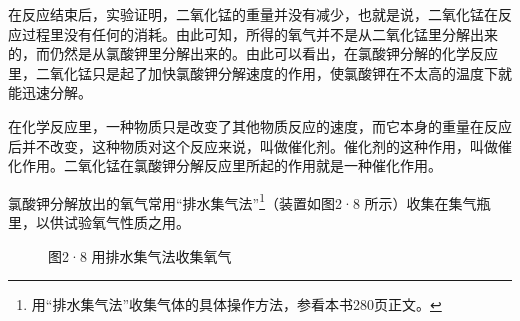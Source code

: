 在反应结束后，实验证明，二氧化锰的重量并没有减少，也就是说，二氧化锰在反应过程里没有任何的消耗。由此可知，所得的氧气并不是从二氧化锰里分解出来的，而仍然是从氯酸钾里分解出来的。由此可以看出，在氯酸钾分解的化学反应里，二氧化锰只是起了加快氯酸钾分解速度的作用，使氯酸钾在不太高的温度下就能迅速分解。

在化学反应里，一种物质只是改变了其他物质反应的速度，而它本身的重量在反应后并不改变，这种物质对这个反应来说，叫做催化剂。催化剂的这种作用，叫做催化作用。二氧化锰在氯酸钾分解反应里所起的作用就是一种催化作用。

氯酸钾分解放出的氧气常用``排水集气法''\footnote{用``排水集气法''收集气体的具体操作方法，参看本书280页正文。}（装置如图2·8
所示）收集在集气瓶里，以供试验氧气性质之用。

\begin{figure}
\centering
\caption{图2·8 用排水集气法收集氧气}
\end{figure}

